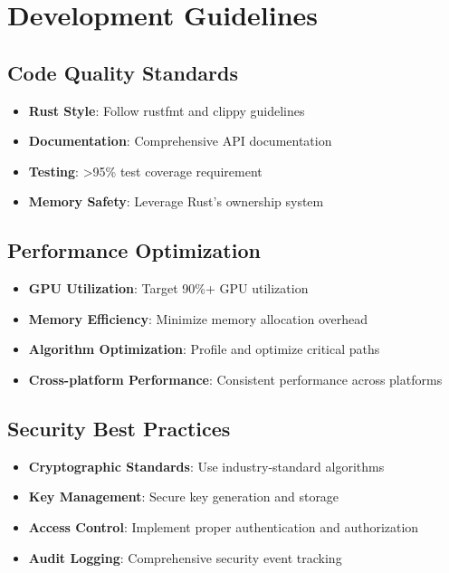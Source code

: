 \documentclass[12pt,a4paper]{article}
\begin{document}
\section{Development Guidelines}

\subsection{Code Quality Standards}
\begin{itemize}
    \item \textbf{Rust Style}: Follow rustfmt and clippy guidelines
    \item \textbf{Documentation}: Comprehensive API documentation
    \item \textbf{Testing}: >95\% test coverage requirement
    \item \textbf{Memory Safety}: Leverage Rust's ownership system
\end{itemize}

\subsection{Performance Optimization}
\begin{itemize}
    \item \textbf{GPU Utilization}: Target 90\%+ GPU utilization
    \item \textbf{Memory Efficiency}: Minimize memory allocation overhead
    \item \textbf{Algorithm Optimization}: Profile and optimize critical paths
    \item \textbf{Cross-platform Performance}: Consistent performance across platforms
\end{itemize}

\subsection{Security Best Practices}
\begin{itemize}
    \item \textbf{Cryptographic Standards}: Use industry-standard algorithms
    \item \textbf{Key Management}: Secure key generation and storage
    \item \textbf{Access Control}: Implement proper authentication and authorization
    \item \textbf{Audit Logging}: Comprehensive security event tracking
\end{itemize}
\end{document}
